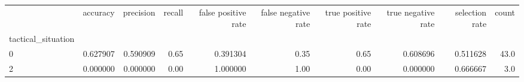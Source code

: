\begin{tabular}{lrrrrrrrrr}
\toprule
{} &  accuracy &  precision &  recall &  false positive rate &  false negative rate &  true positive rate &  true negative rate &  selection rate &  count \\
tactical\_situation &           &            &         &                      &                      &                     &                     &                 &        \\
\midrule
0                  &  0.627907 &   0.590909 &    0.65 &             0.391304 &                 0.35 &                0.65 &            0.608696 &        0.511628 &   43.0 \\
2                  &  0.000000 &   0.000000 &    0.00 &             1.000000 &                 1.00 &                0.00 &            0.000000 &        0.666667 &    3.0 \\
\bottomrule
\end{tabular}
